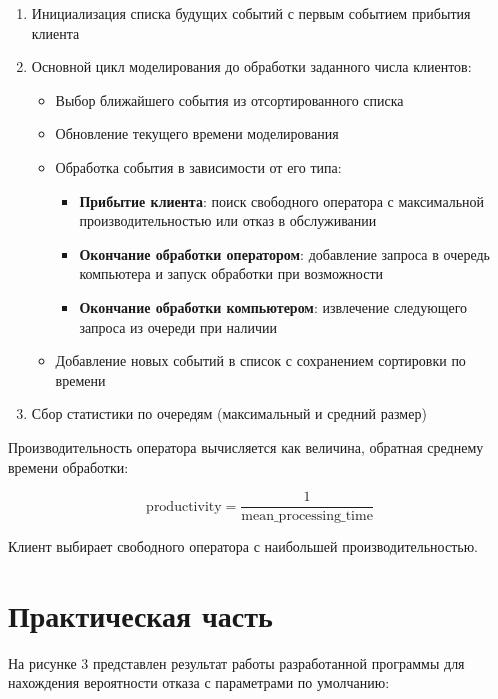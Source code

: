 \begin{enumerate}
    \item Инициализация списка будущих событий с первым событием прибытия клиента
    \item Основной цикл моделирования до обработки заданного числа клиентов:
    \begin{itemize}
        \item Выбор ближайшего события из отсортированного списка
        \item Обновление текущего времени моделирования
        \item Обработка события в зависимости от его типа:
        \begin{itemize}
            \item \textbf{Прибытие клиента}: поиск свободного оператора с максимальной производительностью или отказ в обслуживании
            \item \textbf{Окончание обработки оператором}: добавление запроса в очередь компьютера и запуск обработки при возможности
            \item \textbf{Окончание обработки компьютером}: извлечение следующего запроса из очереди при наличии
        \end{itemize}
        \item Добавление новых событий в список с сохранением сортировки по времени
    \end{itemize}
    \item Сбор статистики по очередям (максимальный и средний размер)
\end{enumerate}

Производительность оператора вычисляется как величина, обратная среднему времени обработки:

\begin{equation}
\text{productivity} = \frac{1}{\text{mean\_processing\_time}}
\end{equation}

Клиент выбирает свободного оператора с наибольшей производительностью.

\section{Практическая часть}

На рисунке 3 представлен результат работы разработанной программы для нахождения вероятности отказа с параметрами по умолчанию:


